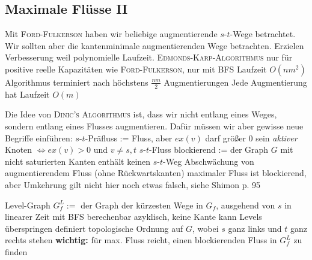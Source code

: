 \subsection{Maximale Flüsse II}

\begin{outline}
\0 Mit \textsc{Ford-Fulkerson} haben wir beliebige augmentierende $s$-$t$-Wege betrachtet. Wir sollten aber die kantenminimale augmentierenden Wege betrachten. Erzielen Verbesserung weil polynomielle Laufzeit.
    \1 \textsc{Edmonds-Karp-Algorithmus}
        \2 nur für positive reelle Kapazitäten
        \2 wie \textsc{Ford-Fulkerson}, nur mit BFS
        \2 Laufzeit $O(nm^2)$
            \3 Algorithmus terminiert nach höchstens $\frac{nm}{2}$ Augmentierungen
            \3 Jede Augmentierung hat Laufzeit $O(m)$

\0 Die Idee von \textsc{Dinic's Algorithmus} ist, dass wir nicht entlang eines Weges, sondern entlang eines Flusses augmentieren. Dafür müssen wir aber gewisse neue Begriffe einführen: 
    \1 $s$-$t$-Präfluss := Fluss, aber $ex(v)$ darf größer 0 sein
        \2 \textit{aktiver} Knoten $\iff ex(v) > 0$ und $v\neq s,t$
    \1 $s$-$t$-Fluss blockierend := der Graph $G$ mit nicht saturierten Kanten enthält keinen $s$-$t$-Weg
        \2 Abschwächung von augmentierendem Fluss (ohne Rückwartskanten)
        \2 maximaler Fluss ist blockierend, aber Umkehrung gilt nicht 
        \2 hier noch etwas falsch, siehe Shimon p. 95
        
    \1 Level-Graph $G^L_f :=$ der Graph der kürzesten Wege in $G_f$, ausgehend von $s$
        \2 in linearer Zeit mit BFS berechenbar
        \2 azyklisch, keine Kante kann Levels überspringen
        \2 definiert topologische Ordnung auf $G$, wobei $s$ ganz links und $t$ ganz rechts stehen
        \2 \textbf{wichtig:} für max. Fluss reicht, einen blockierenden Fluss in $G^L_f$ zu finden


\end{outline}

